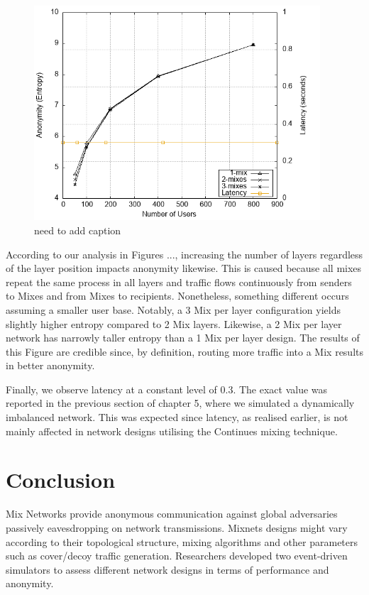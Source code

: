 \documentclass[logo,msc,cyber]{infthesis}   %
\begin{document}
\begin{figure}[h!]
    \centering
    \includegraphics[height=8cm]{figures/simulator_extentions/middle_layer_variable.png}
    \caption{need to add caption}
    \label{fig:middle-layer-variable}
\end{figure} 

According to our analysis in Figures ..., increasing the number of layers
regardless of the layer position impacts anonymity likewise. This is caused
because all mixes repeat the same process in all layers and traffic flows
continuously from senders to Mixes and from Mixes to recipients. Nonetheless,
something different occurs assuming a smaller user base. Notably, a 3 Mix per
layer configuration yields slightly higher entropy compared to 2 Mix layers.
Likewise, a 2 Mix per layer network has narrowly taller entropy than a 1 Mix per
layer design. The results of this Figure are credible since, by definition,
routing more traffic into a Mix results in better anonymity.

Finally, we observe latency at a constant level of 0.3. The exact value was
reported in the previous section of chapter 5, where we simulated a dynamically
imbalanced network. This was expected since latency, as realised earlier, is not
mainly affected in network designs utilising the Continues mixing technique. 

\chapter{Conclusion}

Mix Networks provide anonymous communication against global adversaries
passively eavesdropping on network transmissions. Mixnets designs might vary
according to their topological structure, mixing algorithms and other parameters
such as cover/decoy traffic generation. Researchers developed two event-driven
simulators to assess different network designs in terms of performance and
anonymity.
\end{document}
